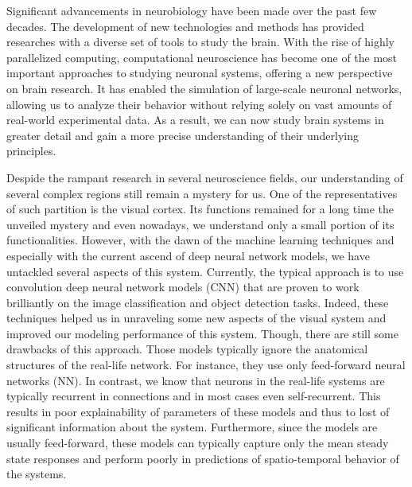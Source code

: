 

Significant advancements in neurobiology have been made over 
the past few decades. The development of new technologies and 
methods has provided researches with a diverse set of tools to
study the brain. With the rise of highly parallelized computing, 
computational neuroscience has become one of the most important 
approaches to studying neuronal systems, offering a new perspective on
brain research. It has enabled the simulation of large-scale neuronal 
networks, allowing us to analyze their behavior without relying solely
on vast amounts of real-world experimental data. As a result, we can 
now study brain systems in greater detail and gain a more precise 
understanding of their underlying principles.

Despide the rampant research in several neuroscience fields, our understanding
of several complex regions still remain a mystery for us. One of the
representatives of such partition is the visual cortex. Its functions
remained for a long time the unveiled mystery and even nowadays, we
understand only a small portion of its functionalities. However, with the 
dawn of the machine learning techniques and especially with the current 
ascend of deep neural network models, we have untackled several aspects of
this system. Currently, the typical approach is to use convolution
deep neural network models (CNN) that are proven to work brilliantly on 
the image classification and object detection tasks. Indeed, these
techniques helped us in unraveling some new aspects of the visual system
and improved our modeling performance of this system. Though, there are still
some drawbacks of this approach. Those models typically ignore the anatomical
structures of the real-life network. For instance, they use only feed-forward
neural networks (NN). In contrast, we know that neurons in the real-life
systems are typically recurrent in connections and in most cases even self-recurrent.
This results in poor explainability of parameters of these models and thus
to lost of significant information about the system. Furthermore, since 
the models are usually feed-forward, these models can typically capture only the
mean steady state responses and perform poorly in predictions of spatio-temporal
behavior of the systems.

